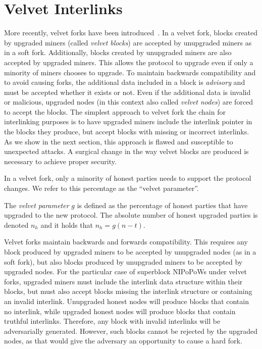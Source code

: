 \section{Velvet Interlinks}\label{sec:velvet}
More recently, velvet forks have been introduced~\cite{velvet}. In a
velvet fork, blocks created by upgraded miners (called \emph{velvet blocks}) are
accepted by unupgraded miners as in a soft fork. Additionally, blocks created by
unupgraded miners are also accepted by upgraded miners. This allows the protocol
to upgrade even if only a minority of miners chooses to upgrade. To maintain
backwards compatibility and to avoid causing forks, the additional data included
in a block is \emph{advisory} and must be accepted whether it exists or not.
Even if the additional data is invalid or malicious, upgraded nodes (in this
context also called \emph{velvet nodes}) are forced to accept the blocks. The
simplest approach to velvet fork the chain for interlinking purposes is to have
upgraded miners include the interlink pointer in the blocks they produce, but
accept blocks with missing or incorrect interlinks. As we show in the next
section, this approach is flawed and susceptible to unexpected attacks. A
surgical change in the way velvet blocks are produced is necessary to achieve
proper security.

In a velvet fork, only a minority of honest parties needs to support the protocol
changes. We refer to this percentage as the ``velvet parameter''.

\begin{definition}
	The \emph{velvet parameter} $g$ is defined as the percentage of honest parties
	that have upgraded to the new protocol. The absolute number of honest upgraded
	parties is denoted $n_h$ and it holds that
	$n_h = g (n - t)$.
	\label{defn:velvet_honest_majority}
\end{definition}

Velvet forks maintain backwards and forwards compatibility. This requires any
block produced by upgraded miners to be accepted by unupgraded nodes (as in a
soft fork), but also blocks produced by unupgraded miners to be accepted by
upgraded nodes. For the particular case of superblock NIPoPoWs under velvet
forks, upgraded miners must include the interlink data structure within their
blocks, but must also accept blocks missing the interlink structure or
containing an invalid interlink. Unupgraded honest nodes will produce blocks
that contain no interlink, while upgraded honest nodes will produce blocks that
contain truthful interlinks. Therefore, any block with invalid interlinks will
be adversarially generated. However, such blocks cannot be rejected by the
upgraded nodes, as that would give the adversary an opportunity to cause a hard
fork.

